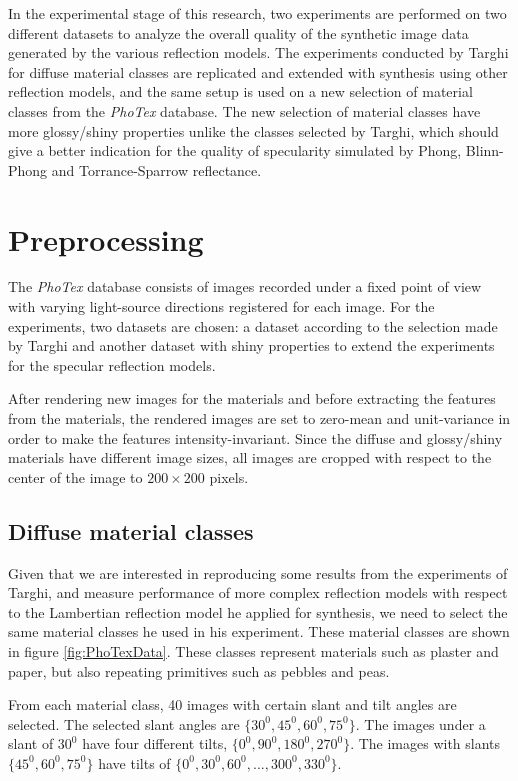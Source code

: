 \hypertarget{experiments}{
}

In the experimental stage of this research, two experiments are performed on two different datasets to analyze the overall quality of the synthetic image data generated by the various reflection models. The experiments conducted by Targhi for diffuse material classes are replicated and extended with synthesis using other reflection models, and the same setup is used on a new selection of material classes from the {\it PhoTex} database. The new selection of material classes have more glossy/shiny properties unlike the classes selected by Targhi, which should give a better indication for the quality of specularity simulated by Phong, Blinn-Phong and Torrance-Sparrow reflectance. 

\section{Preprocessing}\label{sec:preprocessing}
The {\it PhoTex} database consists of images recorded under a fixed point of view with varying light-source directions registered for each image. For the experiments, two datasets are chosen: a dataset according to the selection made by Targhi and another dataset with shiny properties to extend the experiments for the specular reflection models. 

After rendering new images for the materials and before extracting the features from the materials, the rendered images are set to zero-mean and unit-variance in order to make the features intensity-invariant. Since the diffuse and glossy/shiny materials have different image sizes, all images are cropped with respect to the center of the image to $200 \times 200$ pixels.

\subsection{Diffuse material classes}
Given that we are interested in reproducing some results from the experiments of Targhi, and measure performance of more complex reflection models with respect to the Lambertian reflection model he applied for synthesis, we need to select the same material classes he used in his experiment. These material classes are shown in figure \ref{fig:PhoTexData}. These classes represent materials such as plaster and paper, but also repeating primitives such as pebbles and peas.

From each material class, 40 images with certain slant and tilt angles are selected. The selected slant angles are $\{30^0, 45^0,60^0,75^0\}$. The images under a slant of $30^0$ have four different tilts, $\{0^0, 90^0, 180^0, 270^0\}$. The images with slants $\{45^0,60^0,75^0\}$ have tilts of $\{0^0,30^0,60^0,..., 300^0,330^0\}$. 

